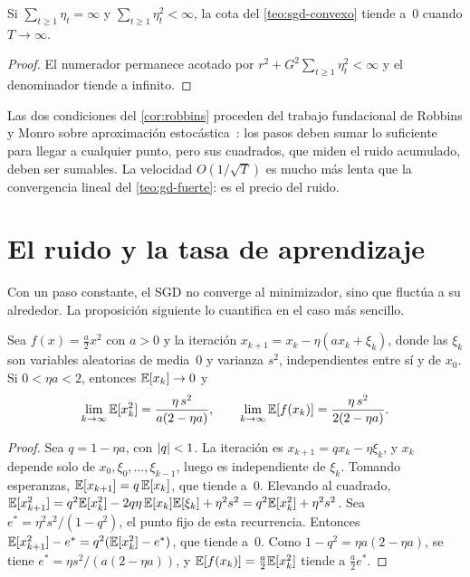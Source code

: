\begin{corolario}\label{cor:robbins}
Si $\sum_{t\ge 1}\eta_t=\infty$ y $\sum_{t\ge 1}\eta_t^{2}<\infty$, la cota del \cref{teo:sgd-convexo} tiende a~0 cuando $T\to\infty$.
\end{corolario}

\begin{proof}
El numerador permanece acotado por $r^{2}+G^{2}\sum_{t\ge 1}\eta_t^{2}<\infty$ y el denominador tiende a infinito.
\end{proof}

Las dos condiciones del \cref{cor:robbins} proceden del trabajo fundacional de Robbins y Monro sobre aproximación estocástica~\cite{robbins}: los pasos deben sumar lo suficiente para llegar a cualquier punto, pero sus cuadrados, que miden el ruido acumulado, deben ser sumables. La velocidad $O(1/\sqrt T)$ es mucho más lenta que la convergencia lineal del \cref{teo:gd-fuerte}: es el precio del ruido.

\section{El ruido y la tasa de aprendizaje}

Con un paso constante, el SGD no converge al minimizador, sino que fluctúa a su alrededor. La proposición siguiente lo cuantifica en el caso más sencillo.

\begin{proposicion}\label{prop:suelo}
Sea $f(x)=\frac{a}{2}x^{2}$ con $a>0$ y la iteración $x_{k+1}=x_k-\eta(ax_k+\xi_k)$, donde las $\xi_k$ son variables aleatorias de media~0 y varianza $s^{2}$, independientes entre sí y de $x_0$. Si $0<\eta a<2$, entonces $\mathbb{E}[x_k]\to 0$ y
\[
\lim_{k\to\infty}\mathbb{E}[x_k^{2}]=\frac{\eta\,s^{2}}{a(2-\eta a)},\qquad
\lim_{k\to\infty}\mathbb{E}[f(x_k)]=\frac{\eta\,s^{2}}{2(2-\eta a)}.
\]
\end{proposicion}

\begin{proof}
Sea $q=1-\eta a$, con $\lvert q\rvert<1$. La iteración es $x_{k+1}=qx_k-\eta\xi_k$, y $x_k$ depende solo de $x_0,\xi_0,\dots,\xi_{k-1}$, luego es independiente de $\xi_k$. Tomando esperanzas, $\mathbb{E}[x_{k+1}]=q\,\mathbb{E}[x_k]$, que tiende a~0. Elevando al cuadrado, $\mathbb{E}[x_{k+1}^{2}]=q^{2}\mathbb{E}[x_k^{2}]-2q\eta\,\mathbb{E}[x_k]\mathbb{E}[\xi_k]+\eta^{2}s^{2}=q^{2}\mathbb{E}[x_k^{2}]+\eta^{2}s^{2}$. Sea $e^{\ast}=\eta^{2}s^{2}/(1-q^{2})$, el punto fijo de esta recurrencia. Entonces $\mathbb{E}[x_{k+1}^{2}]-e^{\ast}=q^{2}(\mathbb{E}[x_k^{2}]-e^{\ast})$, que tiende a~0. Como $1-q^{2}=\eta a(2-\eta a)$, se tiene $e^{\ast}=\eta s^{2}/(a(2-\eta a))$, y $\mathbb{E}[f(x_k)]=\frac{a}{2}\mathbb{E}[x_k^{2}]$ tiende a $\frac{a}{2}e^{\ast}$.
\end{proof}

